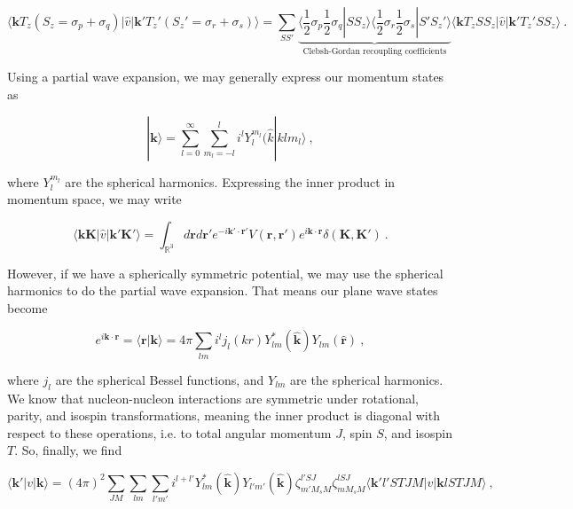 \documentclass[10pt,twoside]{report}
\begin{document}
	\begin{equation}
		\langle \bm{k}T_z(S_z=\sigma_p+\sigma_q) |\hat{v}| \bm{k}'T_z'(S_z'=\sigma_r+\sigma_s)\rangle = \sum_{SS'} \underbrace{\langle\frac{1}{2}\sigma_p\frac{1}{2}\sigma_q|SS_z\rangle\langle\frac{1}{2}\sigma_r\frac{1}{2}\sigma_s|S'S_z'\rangle}_{\text{Clebsh-Gordan recoupling coefficients}} \langle \bm{k}T_zSS_z |\hat{v}| \bm{k}'T_z'SS_z\rangle \:.
	\end{equation}
	
	Using a partial wave expansion, we may generally express our momentum states as
	
	\begin{equation}
		|\bm{k}\rangle = \sum_{l=0}^{\infty}\sum_{m_l=-l}^{l}i^l Y_l^{m_l}(\hat{k}|klm_l\rangle \:,
	\end{equation}
	
	\noindent where  $Y_l^{m_l}$ are the spherical harmonics. Expressing the inner product in momentum space, we may write
	
	\begin{equation}
		\langle\bm{k}\bm{K}|\hat{v}|\bm{k}'\bm{K}'\rangle = \int_{\mathbb{R}^3} d\bm{r}d\bm{r}' e^{-i\bm{k}'\cdot\bm{r}'}V(\bm{r},\bm{r}')e^{i\bm{k}\cdot\bm{r}}\delta(\bm{K},\bm{K}') \:.
	\end{equation}
	
	However, if we have a spherically symmetric potential, we may use the spherical harmonics to do the partial wave expansion. That means our plane wave states become
	
	\begin{equation}
		e^{i\bm{k}\cdot\bm{r}} = \langle \bm{r}|\bm{k}\rangle = 4\pi \sum_{lm}i^lj_l(kr)Y_{lm}^*(\hat{\bm{k}})Y_{lm}(\hat{\bm{r}}) \:,
	\end{equation}
	
	\noindent where $j_l$ are the spherical Bessel functions, and $Y_{lm}$ are the spherical harmonics.\\
	
	We know that nucleon-nucleon interactions are symmetric under rotational, parity, and isospin transformations, meaning the inner product is diagonal with respect to these operations, i.e. to total angular momentum $J$, spin $S$, and isospin $T$. So, finally, we find
	
	\begin{equation}
		\langle \bm{k}'|v|\bm{k}\rangle = (4\pi)^2\sum_{JM}\sum_{lm}\sum_{l'm'} i^{l+l'} Y_{lm}^*(\hat{\bm{k}})Y_{l'm'}(\hat{\bm{k}})\zeta_{m'M_sM}^{l'SJ}\zeta_{mM_sM}^{lSJ}\langle \bm{k}'l'STJM|v|\bm{k}lSTJM\rangle \:,
	\end{equation}
	
\end{document}
